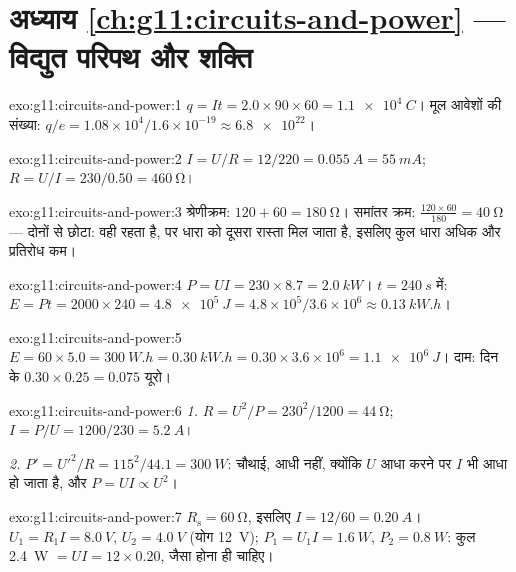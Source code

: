 \section*{अध्याय \ref{ch:g11:circuits-and-power} --- विद्युत परिपथ और शक्ति}

\begin{solution}{exo:g11:circuits-and-power:1}
$q = It = 2.0 \times 90 \times 60 = \qty{1.1e4}{C}$। मूल आवेशों की संख्या: $q/e = 1.08\times10^{4}/1.6\times10^{-19} \approx \num{6.8e22}$।
\end{solution}

\begin{solution}{exo:g11:circuits-and-power:2}
$I = U/R = 12/220 = \qty{0.055}{A} = \qty{55}{mA}$;
$R = U/I = 230/0.50 = \qty{460}{\ohm}$।
\end{solution}

\begin{solution}{exo:g11:circuits-and-power:3}
श्रेणीक्रम: $120 + 60 = \qty{180}{\ohm}$। समांतर क्रम: $\frac{120 \times 60}{180}
= \qty{40}{\ohm}$ --- दोनों से छोटा: 
वही रहता है, पर धारा को दूसरा रास्ता मिल जाता है, इसलिए कुल धारा अधिक और
प्रतिरोध कम।
\end{solution}

\begin{solution}{exo:g11:circuits-and-power:4}
$P = UI = 230 \times 8.7 = \qty{2.0}{kW}$। $t = \qty{240}{s}$ में: $E = Pt = 2000 \times 240 = \qty{4.8e5}{J} = 4.8\times10^{5}/3.6
\times10^{6} \approx \qty{0.13}{kW.h}$।
\end{solution}

\begin{solution}{exo:g11:circuits-and-power:5}
$E = 60 \times 5.0 = \qty{300}{W.h} = \qty{0.30}{kW.h} = 0.30 \times
3.6\times10^{6} = \qty{1.1e6}{J}$। दाम: दिन के $0.30 \times 0.25 = 0.075$ यूरो।
\end{solution}

\begin{solution}{exo:g11:circuits-and-power:6}
\emph{1.} $R = U^2/P = 230^2/1200 = \qty{44}{\ohm}$; $I = P/U = 1200/230 = \qty{5.2}{A}$।

\emph{2.} $P' = U'^2/R = 115^2/44.1 = \qty{300}{W}$: चौथाई, आधी नहीं, क्योंकि $U$ आधा करने पर $I$ भी आधा
हो जाता है, और $P = UI \propto U^2$।
\end{solution}

\begin{solution}{exo:g11:circuits-and-power:7}
$R_{\text{s}} = \qty{60}{\ohm}$, इसलिए $I = 12/60 = \qty{0.20}{A}$। $U_1 = R_1 I = \qty{8.0}{V}$, $U_2 = \qty{4.0}{V}$ (योग \qty{12}{V}); $P_1 = U_1 I = \qty{1.6}{W}$, $P_2 = \qty{0.8}{W}$: कुल
\qty{2.4}{W} $= UI = 12 \times 0.20$, जैसा होना ही चाहिए।
\end{solution}

